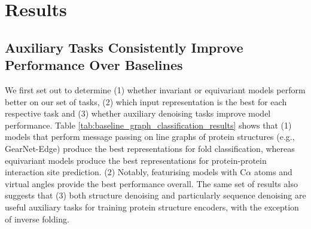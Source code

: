 \section{Results}
\subsection{Auxiliary Tasks Consistently Improve Performance Over Baselines}

We first set out to determine (1) whether invariant or equivariant models perform better on our set of tasks, (2) which input representation is the best for each respective task and (3) whether auxiliary denoising tasks improve model performance. Table \ref{tab:baseline_graph_classification_results} shows that (1) models that perform message passing on line graphs of protein structures (e.g., GearNet-Edge) produce the best representations for fold classification, whereas equivariant models produce the best representations for protein-protein interaction site prediction. (2) Notably, featurising models with C$\alpha$ atoms and virtual angles provide the best performance overall. The same set of results also suggests that (3) both structure denoising and particularly sequence denoising are useful auxiliary tasks for training protein structure encoders, with the exception of inverse folding.

